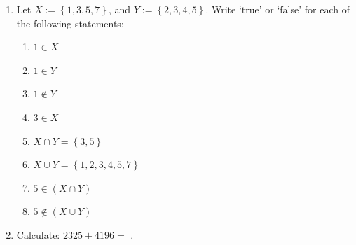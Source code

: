 \documentclass{tufte-book}
\begin{document}
\begin{enumerate}
  \item Let $X := \left\{1, 3, 5, 7\right\}$, and $Y := \left\{2, 3, 4, 5\right\}$.
  Write `true' or `false' for each of the following statements:
  \begin{multicols}{2}
    \begin{enumerate}
      \item $1 \in X$ \dotfill\bigskip
      \item $1 \in Y$ \dotfill\bigskip
      \item $1 \notin Y$ \dotfill\bigskip
      \item $3 \in X$ \dotfill
      \item $X \cap Y = \left\{3, 5\right\}$ \dotfill\bigskip
      \item $X \cup Y = \left\{1, 2, 3, 4, 5, 7\right\}$ \dotfill\bigskip
      \item $5 \in \left(X \cap Y\right)$ \dotfill\bigskip
      \item $5 \notin \left(X \cup Y\right)$ \dotfill\bigskip
    \end{enumerate}
  \end{multicols}
  
  \item Calculate: $2325 + 4196 =$ \dotfill.
\end{enumerate}
\end{document}
